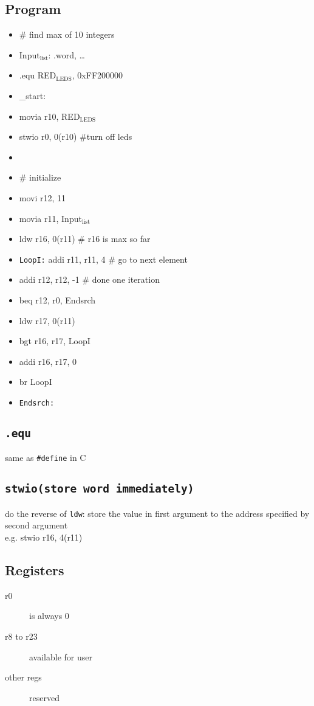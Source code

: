 \documentclass[11pt]{article}
\begin{document}
\subsection{Program}
\label{sec:orgheadline8}
\begin{itemize}
\item \# find max of 10 integers
\item Input\(_{\text{list}}\): .word, \ldots{}
\item .equ RED\(_{\text{LEDS}}\), 0xFF200000
\item \_start:
\item movia r10, RED\(_{\text{LEDS}}\)
\item stwio r0, 0(r10) \#turn off leds
\item

\item \# initialize
\item movi r12, 11
\item movia r11, Input\(_{\text{list}}\)
\item ldw r16, 0(r11) \# r16 is max so far
\item \texttt{LoopI:} addi r11, r11, 4 \# go to next element
\item addi r12, r12, -1 \# done one iteration
\item beq r12, r0, Endsrch
\item ldw r17, 0(r11)
\item bgt r16, r17, LoopI
\item addi r16, r17, 0
\item br LoopI
\item \texttt{Endsrch:}
\end{itemize}

\subsection{\texttt{.equ}}
\label{sec:orgheadline9}
same as \texttt{\#define} in C
\subsection{\texttt{stwio(store word immediately)}}
\label{sec:orgheadline10}
do the reverse of \texttt{ldw}:
store the value in first argument to the address specified by second argument \\
e.g. stwio r16, 4(r11)
\subsection{Registers}
\label{sec:orgheadline11}
\begin{description}
\item[{r0}] is always 0
\item[{r8 to r23}] available for user
\item[{other regs}] reserved
\end{description}
\end{document}
